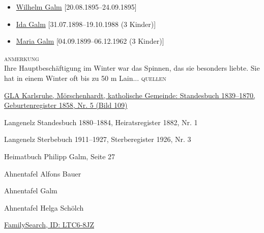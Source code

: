 \begin{person}[
    surname = {Schwanninger},
    givenname = {Karolina},
    suffix = {1858--1926},
    label = {@I145@}
    ]
\begin{itemize}
\item \hyperref[@I2032@]{Wilhelm Galm} [20.08.1895--24.09.1895]
\item \hyperref[@I168@]{Ida Galm} [31.07.1898--19.10.1988 (3 Kinder)]
\item \hyperref[@I169@]{Maria Galm} [04.09.1899--06.12.1962 (3 Kinder)]
\end{itemize}
\medbreak
\textsc{anmerkung}\\
Ihre Hauptbeschäftigung im Winter war das Spinnen, das sie besonders liebte. Sie hat in einem Winter oft bis zu 50 m Lain...
\medbreak
\textsc{{quellen}}
\begin{enumerate}[label={[\arabic*]}]
\item \href{http://www.landesarchiv-bw.de/plink/?f=4-1119442-109}{GLA Karlsruhe, Mörschenhardt, katholische Gemeinde: Standesbuch 1839–1870, Geburtenregister 1858, Nr. 5 (Bild 109)}
\item Langenelz Standesbuch 1880–1884, Heiratsregister 1882, Nr. 1
\item Langenelz Sterbebuch 1911–1927, Sterberegister 1926, Nr. 3
\item Heimatbuch Philipp Galm, Seite 27
\item Ahnentafel Alfons Bauer
\item Ahnentafel Galm
\item Ahnentafel Helga Schölch
\item \href{https://www.familysearch.org/tree/person/details/LTC6-8JZ}{FamilySearch, ID: LTC6-8JZ}
\end{enumerate}

\end{person}

